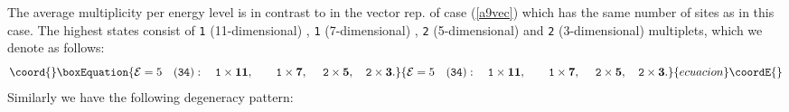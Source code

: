 \documentclass[a4paper,12pt]{article}
\begin{document}
The average multiplicity per energy level is
\coordHE{} in contrast to
\coordHE{} in the vector rep. of \coordHE{} case
(\ref{a9vec}) which has the
same number of sites as in this case. The
highest
\coordHE{} states consist of {\tt 1} \coordHE{} (11-dimensional) , {\tt 1}
\coordHE{}
(7-dimensional) , {\tt 2}
\coordHE{} (5-dimensional)  and {\tt 2}
\coordHE{} (3-dimensional) multiplets, which we denote as follows:
\begin{equation}\coord{}\boxEquation{
{\cal E}=5\quad ({\tt 34}):\quad {\tt 1} \times {\bf 11},
\qquad {\tt 1} \times {\bf
7},\quad\ {\tt 2}\times {\bf 5},\quad {\tt 2}\times {\bf 3}.
}{
{\cal E}=5\quad ({\tt 34}):\quad {\tt 1} \times {\bf 11},
\qquad {\tt 1} \times {\bf
7},\quad\ {\tt 2}\times {\bf 5},\quad {\tt 2}\times {\bf 3}.
}{ecuacion}\coordE{}\end{equation}
Similarly we have the following degeneracy pattern:
\end{document}
